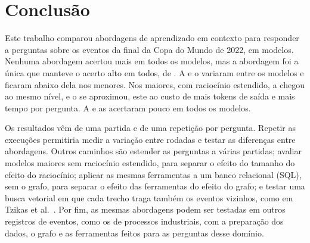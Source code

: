 %

\section{Conclusão}\label{sec:conclusão}

Este trabalho comparou \nArms{} abordagens de aprendizado em contexto para responder a perguntas sobre os eventos
da final da Copa do Mundo de 2022, em \nModels{} modelos. Nenhuma abordagem acertou mais em todos os modelos, mas a
abordagem \armGraphTools{} foi a única que manteve o acerto alto em todos, de \accRangeGraphTools{}. A \armTextToCypher{} e o
\armEventsInPrompt{} variaram entre os modelos e ficaram abaixo dela nos menores. Nos maiores, com raciocínio
estendido, a \armTextToCypher{} chegou ao mesmo nível, e o \armEventsInPrompt{} se aproximou, este ao custo de mais
tokens de saída e mais tempo por pergunta. A \armVector{} e as \armStatsInPrompt{} acertaram pouco em todos os modelos.

Os resultados vêm de uma partida e de uma repetição por pergunta. Repetir as execuções permitiria medir a variação
entre rodadas e testar as diferenças entre abordagens. Outros caminhos são estender as perguntas a várias partidas;
avaliar modelos maiores sem raciocínio estendido, para separar o efeito do tamanho do efeito do raciocínio; aplicar
as mesmas ferramentas a um banco relacional (SQL), sem o grafo, para separar o efeito das ferramentas do efeito do
grafo; e testar uma busca vetorial em que cada trecho traga também os eventos vizinhos, como em Tzikas et
al.~\cite{tzikas2025dynamic}. Por fim, as mesmas abordagens podem ser testadas em outros registros de eventos, como
os de processos industriais, com a preparação dos dados, o grafo e as ferramentas feitos para as perguntas desse
domínio.
